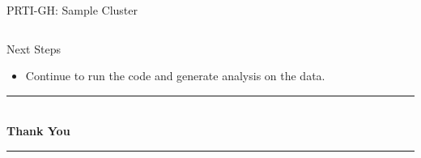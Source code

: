\documentclass[9pt]{beamer}
\begin{document}
\begin{frame}{PRTI-GH: Sample Cluster}
{\begin{tabular}{l l c r c c l l}
			\bottomrule
		\end{tabular}%
	}
	
	
\end{frame}

	\begin{frame}{Next Steps}
		\begin{itemize}
			\item Continue to run the code and generate analysis on the data.
		\end{itemize}
	\end{frame}
	
	\begin{frame}[plain]
		\centering
		\vfill
		{\rule{6cm}{0.6pt}}\\[0.8cm]
		{\fontsize{28}{32}\selectfont \textcolor{blue!55!black}{\textbf{Thank You}}}\\[0.5cm]
		{\rule{6cm}{0.6pt}}
		\vfill
	\end{frame}
	
\end{document}
